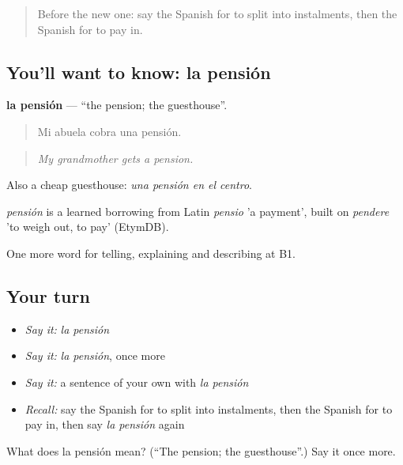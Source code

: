 \label{lesson:ES-C632-pension}



\begin{quote}
Before the new one: say the Spanish for to split into instalments, then the Spanish for to pay in.
\end{quote}

\subsection*{You'll want to know: la pensión}
\textbf{la pensión} — \textquotedblleft{}the pension; the guesthouse\textquotedblright{}.

\begin{quote}
Mi abuela cobra una pensión.
\end{quote}

\begin{quote}
\emph{My grandmother gets a pension.}
\end{quote}

Also a cheap guesthouse: \emph{una pensión en el centro}.

\begin{cousinweb}
\emph{pensión} is a learned borrowing from Latin \emph{pensio} 'a payment', built on \emph{pendere} 'to weigh out, to pay' (EtymDB).
\end{cousinweb}

\begin{grammarlens}[title={What you've built}]
One more word for telling, explaining and describing at B1.
\end{grammarlens}

\subsection*{Your turn}
\begin{itemize}
\raggedright
  \item \emph{Say it:} \emph{la pensión}
  \item \emph{Say it:} \emph{la pensión}, once more
  \item \emph{Say it:} a sentence of your own with \emph{la pensión}
  \item \emph{Recall:} say the Spanish for to split into instalments, then the Spanish for to pay in, then say \emph{la pensión} again
\end{itemize}

\begin{tcolorbox}[breakable,colback=teal!4,colframe=teal!35!black,title={Before you move on}]
What does la pensión mean? (\textquotedblleft{}The pension; the guesthouse\textquotedblright{}.) Say it once more.
\end{tcolorbox}
